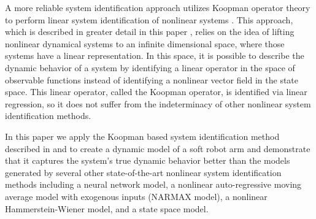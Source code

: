 A more reliable system identification approach utilizes Koopman operator theory to perform linear system identification of nonlinear systems .
This approach, which is described in greater detail in this paper , relies on the idea of lifting nonlinear dynamical systems to an infinite dimensional space, where those systems have a linear representation.
In this space, it is possible to describe the dynamic behavior of a system by identifying a linear operator in the space of observable functions instead of identifying a nonlinear vector field in the state space.
This linear operator, called the Koopman operator, is identified via linear regression, so it does not suffer from the indeterminacy of other nonlinear system identification methods.

In this paper we apply the Koopman based system identification method described in \cite{mauroy2016linear} and \cite{mauroy2017koopman} to create a dynamic model of a soft robot arm and demonstrate that it captures the system's true dynamic behavior better than the models generated by several other state-of-the-art nonlinear system identification methods including a neural network model, a nonlinear auto-regressive moving average model with exogenous inputs (NARMAX model), a nonlinear Hammerstein-Wiener model, and a state space model.

